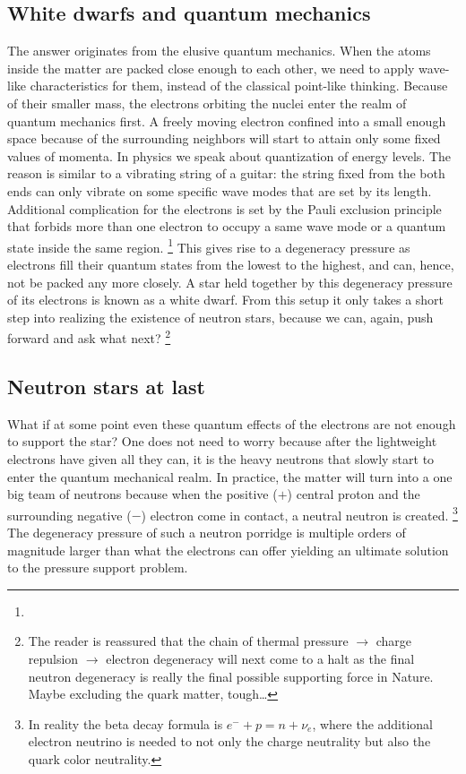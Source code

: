 \subsection{White dwarfs and quantum mechanics}
The answer originates from the elusive quantum mechanics.
When the atoms inside the matter are packed close enough to each other, we need to apply wave-like characteristics for them, instead of the classical point-like thinking.
Because of their smaller mass, the electrons orbiting the nuclei enter the realm of quantum mechanics first.
A freely moving electron confined into a small enough space because of the surrounding neighbors will start to attain only some fixed values of momenta.
In physics we speak about quantization of energy levels.
The reason is similar to a vibrating string of a guitar: the string fixed from the both ends can only vibrate on some specific wave modes that are set by its length.
Additional complication for the electrons is set by the Pauli exclusion principle that forbids more than one electron to occupy a same wave mode or a quantum state inside the same region.%
\footnote{}
This gives rise to a degeneracy pressure as electrons fill their quantum states from the lowest to the highest, and can, hence, not be packed any more closely.
A star held together by this degeneracy pressure of its electrons is known as a white dwarf.
From this setup it only takes a short step into realizing the existence of neutron stars, because we can, again, push forward and ask what next?%
\footnote{The reader is reassured that the chain of thermal pressure $\rightarrow$ charge repulsion $\rightarrow$ electron degeneracy will next come to a halt as the final neutron degeneracy is really the final possible supporting force in Nature. Maybe excluding the quark matter, tough\ldots}


\subsection{Neutron stars at last}
What if at some point even these quantum effects of the electrons are not enough to support the star?
One does not need to worry because after the lightweight electrons have given all they can, it is the heavy neutrons that slowly start to enter the quantum mechanical realm.
In practice, the matter will turn into a one big team of neutrons because when the positive ($+$) central proton and the surrounding negative ($-$) electron come in contact, a neutral neutron is created.%
\footnote{In reality the beta decay formula is $e^- + p = n + \nu_e$, where the additional electron neutrino is needed to not only the charge neutrality but also the quark color neutrality.}
The degeneracy pressure of such a neutron porridge is multiple orders of magnitude larger than what the electrons can offer yielding an ultimate solution to the pressure support problem.

